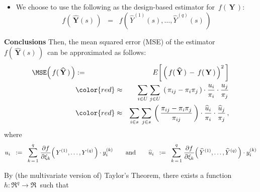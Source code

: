 \begin{proposition}
\begin{itemize}
    The target population parameter is:
    \begin{equation*}
    f\!\left(\,\mathbf{Y}\,\right)
    \;\; = \;\;
        f\!\left(\,Y^{(1)},\ldots,Y^{(q)}\,\right)
    \end{equation*}
\item
    We choose to use the following as the design-based estimator for \,$f\!\left(\,\mathbf{Y}\,\right)$:
    \begin{equation*}
    f\!\left(\,\widehat{\mathbf{Y}}(s)\,\right)
    \;\; = \;\;
        f\!\left(\,\widehat{Y}^{(1)}(s),\ldots,\widehat{Y}^{(q)}(s)\,\right)
    \end{equation*}
\end{itemize}
\vskip 0.1cm
\noindent
\textbf{Conclusions}
\vskip 0.1cm
\noindent
Then, the mean squared error (MSE) of the estimator
\,$f\!\left(\,\widehat{\mathbf{Y}}(s)\,\right)$\,
can be approximated as follows:
\begin{eqnarray*}
\MSE\!\left(\,
    f(\,\widehat{\mathbf{Y}}\,)
    \,\right)
& := &
    E\!\left[\,\left(\,
        f(\,\widehat{\mathbf{Y}}\,)
        \, - \,
        f(\,\mathbf{Y}\,)
        \,\right)^{2}\,\right]
\\
& {\color{red}\approx} &
    \underset{i \in U}{\sum}\;
    \underset{j \in U}{\sum}\;
    \left(\,\pi_{ij} - \pi_{i}\pi_{j}\,\right)
    \cdot
    \dfrac{u_{i}}{\pi_{i}}
    \cdot
    \dfrac{u_{j}}{\pi_{j}}
\\
& {\color{red}\approx} &
    \underset{i \in s}{\sum}\;
    \underset{j \in s}{\sum}\,
    \left(\,
        \dfrac{
            \pi_{ij} - \pi_{i}\pi_{j}
            }{
            \pi_{ij}
            }
        \,\right)
    \cdot
    \dfrac{\widehat{u}_{i}}{\pi_{i}}
    \cdot
    \dfrac{\widehat{u}_{j}}{\pi_{j}}\,,
\end{eqnarray*}
where
\begin{equation*}
u_{i}
\;\; := \;\;
    \overset{q}{\underset{k\,=\,1}{\sum}}\;
    \dfrac{\partial f}{\partial \xi_{k}}\!\left(\,
        Y^{(1)},\ldots,Y^{(q)}
        \,\right)
    \cdot
    y^{(k)}_{i}
\quad\quad
\textnormal{and}
\quad\quad
\widehat{u}_{i}
\;\; := \;\;
    \overset{q}{\underset{k\,=\,1}{\sum}}\;
    \dfrac{\partial f}{\partial \xi_{k}}\!\left(\,
        \widehat{Y}^{(1)},\ldots,\widehat{Y}^{(q)}
        \,\right)
    \cdot
    y^{(k)}_{i}
\end{equation*}
\end{proposition}
\proof
By (the multivariate version of) Taylor's Theorem, there exists a function
\,$h : \Re^{q} \longrightarrow \Re$\, such that
